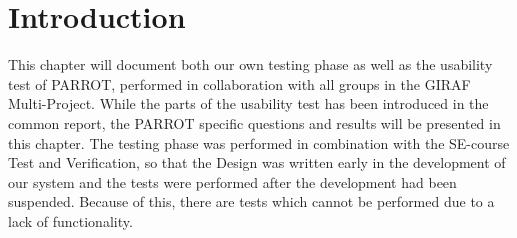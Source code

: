 \section{Introduction}
This chapter will document both our own testing phase as well as the usability test of PARROT, performed in collaboration with all groups in the GIRAF Multi-Project.
While the parts of the usability test has been introduced in the common report, the PARROT specific questions and results will be presented in this chapter.
The testing phase was performed in combination with the SE-course Test and Verification, so that the Design was written early in the development of our system and the tests were performed after the development had been suspended.
Because of this, there are tests which cannot be performed due to a lack of functionality.